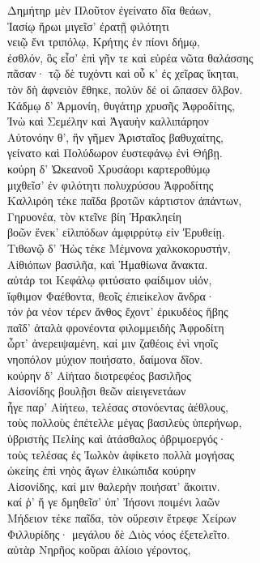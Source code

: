 \begin{pages}
\begin{Leftside}
\quad{}Δημήτηρ μὲν Πλοῦτον ἐγείνατο δῖα θεάων,\\
Ἰασίῳ ἥρωι μιγεῖσ' ἐρατῇ φιλότητι  \\
νειῷ ἔνι τριπόλῳ, Κρήτης ἐν πίονι δήμῳ,\\
ἐσθλόν, ὃς εἶσ' ἐπὶ γῆν τε καὶ εὐρέα νῶτα θαλάσσης\\
πᾶσαν· τῷ δὲ τυχόντι καὶ οὗ κ' ἐς χεῖρας ἵκηται, \\
τὸν δὴ ἀφνειὸν ἔθηκε, πολὺν δέ οἱ ὤπασεν ὄλβον.\\

\quad{}Κάδμῳ δ' Ἁρμονίη, θυγάτηρ χρυσῆς Ἀφροδίτης, \\
Ἰνὼ καὶ Σεμέλην καὶ Ἀγαυὴν καλλιπάρηον \\
Αὐτονόην θ', ἣν γῆμεν Ἀρισταῖος βαθυχαίτης,\\
γείνατο καὶ Πολύδωρον ἐυστεφάνῳ ἐνὶ Θήβῃ.\\
κούρη δ' Ὠκεανοῦ Χρυσάορι καρτεροθύμῳ\\

\quad{}μιχθεῖσ' ἐν φιλότητι πολυχρύσου Ἀφροδίτης \\
Καλλιρόη τέκε παῖδα βροτῶν κάρτιστον ἁπάντων,\\
Γηρυονέα, τὸν κτεῖνε βίη Ἡρακληείη\\
βοῶν ἕνεκ' εἰλιπόδων ἀμφιρρύτῳ εἰν Ἐρυθείῃ.\\
Τιθωνῷ δ' Ἠὼς τέκε Μέμνονα χαλκοκορυστήν,\\

\quad{}Αἰθιόπων βασιλῆα, καὶ Ἠμαθίωνα ἄνακτα. \\
αὐτάρ τοι Κεφάλῳ φιτύσατο φαίδιμον υἱόν, \\
ἴφθιμον Φαέθοντα, θεοῖς ἐπιείκελον ἄνδρα· \\
τόν ῥα νέον τέρεν ἄνθος ἔχοντ' ἐρικυδέος ἥβης\\
παῖδ' ἀταλὰ φρονέοντα φιλομμειδὴς Ἀφροδίτη\\
ὦρτ' ἀνερειψαμένη, καί μιν ζαθέοις ἐνὶ νηοῖς  \\
νηοπόλον μύχιον ποιήσατο, δαίμονα δῖον. \\
κούρην δ' Αἰήταο διοτρεφέος βασιλῆος\\

\quad{}Αἰσονίδης βουλῇσι θεῶν αἰειγενετάων\\
ἦγε παρ' Αἰήτεω, τελέσας στονόεντας ἀέθλους,\\
τοὺς πολλοὺς ἐπέτελλε μέγας βασιλεὺς ὑπερήνωρ, \\
ὑβριστὴς Πελίης καὶ ἀτάσθαλος ὀβριμοεργός· \\
τοὺς τελέσας ἐς Ἰωλκὸν ἀφίκετο πολλὰ μογήσας\\
ὠκείης ἐπὶ νηὸς ἄγων ἑλικώπιδα κούρην\\
Αἰσονίδης, καί μιν θαλερὴν ποιήσατ' ἄκοιτιν.\\
καί ῥ' ἥ γε δμηθεῖσ' ὑπ' Ἰήσονι ποιμένι λαῶν  \\
Μήδειον τέκε παῖδα, τὸν οὔρεσιν ἔτρεφε Χείρων\\
Φιλλυρίδης· μεγάλου δὲ Διὸς νόος ἐξετελεῖτο. \\
αὐτὰρ Νηρῆος κοῦραι ἁλίοιο γέροντος,\\


\end{Leftside}
\end{pages}
